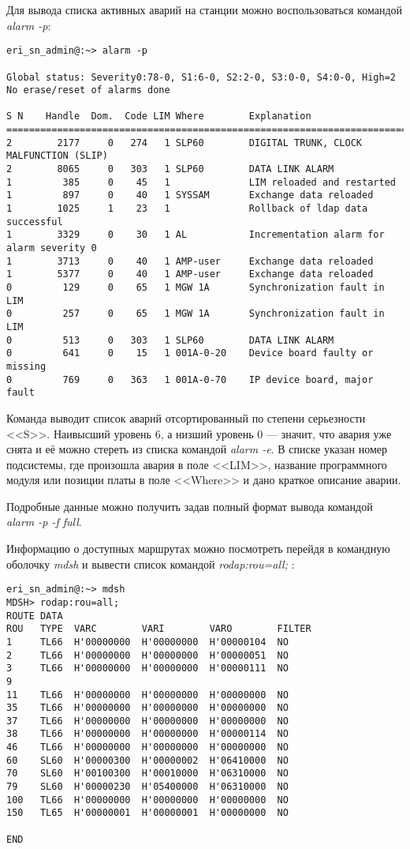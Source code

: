 Для вывода списка активных аварий на станции можно воспользоваться командой {\em alarm -p}:
\begin{lstlisting}
eri_sn_admin@:~> alarm -p

Global status: Severity0:78-0, S1:6-0, S2:2-0, S3:0-0, S4:0-0, High=2
No erase/reset of alarms done

S N    Handle  Dom.  Code LIM Where        Explanation
=============================================================================
2        2177     0   274   1 SLP60        DIGITAL TRUNK, CLOCK MALFUNCTION (SLIP)
2        8065     0   303   1 SLP60        DATA LINK ALARM
1         385     0    45   1              LIM reloaded and restarted
1         897     0    40   1 SYSSAM       Exchange data reloaded
1        1025     1    23   1              Rollback of ldap data successful
1        3329     0    30   1 AL           Incrementation alarm for alarm severity 0
1        3713     0    40   1 AMP-user     Exchange data reloaded
1        5377     0    40   1 AMP-user     Exchange data reloaded
0         129     0    65   1 MGW 1A       Synchronization fault in LIM
0         257     0    65   1 MGW 1A       Synchronization fault in LIM
0         513     0   303   1 SLP60        DATA LINK ALARM
0         641     0    15   1 001A-0-20    Device board faulty or missing
0         769     0   363   1 001A-0-70    IP device board, major fault
\end{lstlisting}

Команда выводит список аварий отсортированный по степени серьезности <<S>>. Наивысший уровень 6, а низший уровень 0 --- значит, что авария уже снята и её можно стереть из списка командой {\em alarm -e}. В списке указан номер подсистемы, где произошла авария в поле <<LIM>>, название программного модуля или позиции платы в поле <<Where>> и дано краткое описание аварии.

Подробные данные можно получить задав полный формат вывода командой {\em alarm -p -f full}.

Информацию о доступных маршрутах можно посмотреть перейдя в командную оболочку {\em mdsh} и вывести список командой {\em rodap:rou=all;} :  
\begin{lstlisting}
eri_sn_admin@:~> mdsh
MDSH> rodap:rou=all;
ROUTE DATA
ROU   TYPE  VARC        VARI        VARO        FILTER
1     TL66  H'00000000  H'00000000  H'00000104  NO
2     TL66  H'00000000  H'00000000  H'00000051  NO
3     TL66  H'00000000  H'00000000  H'00000111  NO
9
11    TL66  H'00000000  H'00000000  H'00000000  NO
35    TL66  H'00000000  H'00000000  H'00000000  NO
37    TL66  H'00000000  H'00000000  H'00000000  NO
38    TL66  H'00000000  H'00000000  H'00000114  NO
46    TL66  H'00000000  H'00000000  H'00000000  NO
60    SL60  H'00000300  H'00000002  H'06410000  NO
70    SL60  H'00100300  H'00010000  H'06310000  NO
79    SL60  H'00000230  H'05400000  H'06310000  NO
100   TL66  H'00000000  H'00000000  H'00000000  NO
150   TL65  H'00000001  H'00000001  H'00000000  NO

END
\end{lstlisting}

